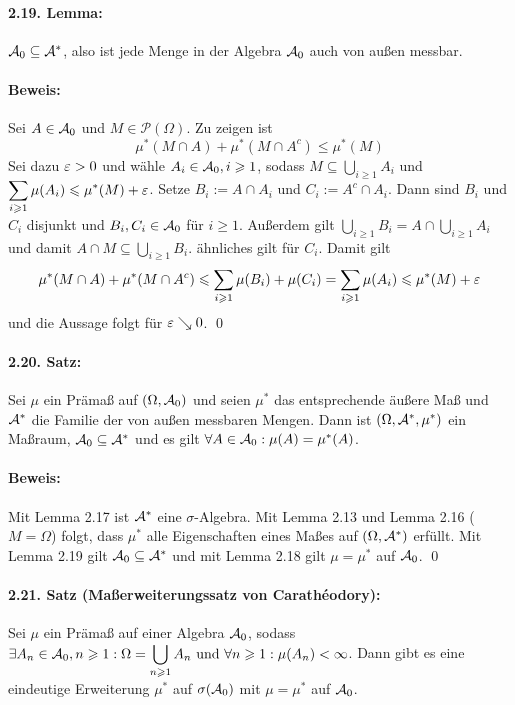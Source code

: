 \documentclass[12pt]{report}
\begin{document}
\paragraph{2.19. Lemma:}$\mathcal{A}_0\subseteq \mathcal{A}^*$, also ist jede Menge in der Algebra $\mathcal{A}_0$ auch von au\ss{}en messbar. 

\paragraph{Beweis:}Sei $A\in\mathcal{A}_0$ und $M\in\mathcal{P}(\Omega)$. Zu zeigen ist
$$\mu^*(M\cap A)+\mu^*(M\cap A^c)\leq\mu^*(M)$$
Sei dazu $\varepsilon>0$ und w\"ahle $A_i\in\mathcal{A}_0,i\geqslant1$, sodass $M\subseteq\displaystyle\bigcup_{i\geq1}A_i$ und $\displaystyle\sum_{i\geqslant1}\mu(A_i)\leqslant\mu^*(M)+\varepsilon$. Setze $B_i:=A\cap A_i$ und $C_i:=A^c\cap A_i$. Dann sind $B_i$ und $C_i$ disjunkt und $B_i,C_i\in\mathcal{A}_0$ f\"ur $i\geq1$. Au\ss{}erdem gilt $\displaystyle\bigcup_{i\geq1}B_i=A\cap\bigcup_{i\geq1}A_i$ und damit $A\cap M\subseteq \displaystyle\bigcup_{i\geq1}B_i$. \"ahnliches gilt f\"ur $C_i$. Damit gilt
$$\mu^*(M\cap A)+\mu^*(M\cap A^c)\leqslant\sum_{i\geqslant1}\mu(B_i)+\mu(C_i)=\sum_{i\geqslant1}\mu(A_i)\leqslant\mu^*(M)+\varepsilon$$
und die Aussage folgt f\"ur $\varepsilon\searrow 0$. \qed

\paragraph{2.20. Satz:}Sei $\mu$ ein Pr\"ama\ss{} auf $(\Omega,\mathcal{A}_0)$ und seien $\mu^*$ das entsprechende \"au\ss{}ere Ma\ss{} und $\mathcal{A}^*$ die Familie der von au\ss{}en messbaren Mengen. Dann ist $(\Omega,\mathcal{A}^*,\mu^*)$ ein Ma\ss{}raum, $\mathcal{A}_0\subseteq\mathcal{A}^*$ und es gilt $\forall A\in\mathcal{A}_0:\mu(A)=\mu^*(A)$. 

\paragraph{Beweis:}Mit Lemma 2.17 ist $\mathcal{A}^*$ eine $\sigma$-Algebra. Mit Lemma 2.13 und Lemma 2.16 ($M=\Omega$) folgt, dass $\mu^*$ alle Eigenschaften eines Ma\ss{}es auf $(\Omega,\mathcal{A}^*)$ erf\"ullt. Mit Lemma 2.19 gilt $\mathcal{A}_0\subseteq\mathcal{A}^*$ und mit Lemma 2.18 gilt $\mu=\mu^*$ auf $\mathcal{A}_0$. \qed

\paragraph{2.21. Satz (Ma\ss{}erweiterungssatz von Carath\'eodory):}Sei $\mu$ ein Pr\"ama\ss{} auf einer Algebra $\mathcal{A}_0$, sodass $\exists A_n\in\mathcal{A}_0,n\geqslant1:\Omega=\displaystyle\bigcup_{n\geqslant1}A_n\text{ und }\forall n\geqslant1:\mu(A_n)<\infty$. Dann gibt es eine eindeutige Erweiterung $\mu^*$ auf $\sigma(\mathcal{A}_0)$ mit $\mu=\mu^*$ auf $\mathcal{A}_0$.
\end{document}
